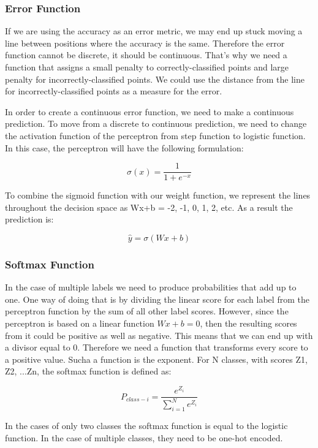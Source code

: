 \documentclass{article}
\begin{document}
\subsubsection{Error Function}
If we are using the accuracy as an error metric, we may end up stuck moving a line between positions where the accuracy is the same. Therefore the error function cannot be discrete, it should be continuous. That’s why we need a function that assigns a small penalty to correctly-classified points and large penalty for incorrectly-classified points. We could use the distance from the line for incorrectly-classified points as a measure for the error.

In order to create a continuous error function, we need to make a continuous prediction. To move from a discrete to continuous prediction, we need to change the activation function of the perceptron from step function to logistic function. In this case, the perceptron will have the following formulation:

\begin{equation}
  \sigma(x) = \frac{1}{1 + e^{-x}}
\end{equation}

To combine the sigmoid function with our weight function, we represent the lines throughout the decision space as Wx+b = -2, -1, 0, 1, 2, etc. As a result the prediction is:

\begin{equation}
  \hat{y} = \sigma(Wx + b)
\end{equation}

\subsubsection{Softmax Function}
In the case of multiple labels we need to produce probabilities that add up to one. One way of doing that is by dividing the linear score for each label from the perceptron function by the sum of all other label scores. However, since the perceptron is based on a linear function $Wx + b = 0$, then the resulting scores from it could be positive as well as negative. This means that we can end up with a divisor equal to 0. Therefore we need a function that transforms every score to a positive value. Sucha a function is the exponent. For N classes, with scores Z1, Z2, ...Zn, the softmax function is defined as:

\begin{equation}
  P_{class-i} = \frac{e^{Z_i}}{\sum_{i = 1}^{N} e^{Z_i}}
\end{equation}

In the cases of only two classes the softmax function is equal to the logistic function. In the case of multiple classes, they need to be one-hot encoded.
\end{document}

